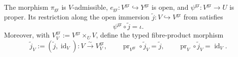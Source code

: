 \begin{lemma}
  \label{lemma:nagata-graph-extension}
  \lean{}

  The morphism $\pi_{\mathrm{gr}}$ is $V$-admissible,
  $e_{\mathrm{gr}}\colon V^{\mathrm{gr}}\hookrightarrow Y^{\mathrm{gr}}$ is
  open, and
  $\psi^{\mathrm{gr}}\colon V^{\mathrm{gr}}\to U$ is proper.  Its
  restriction along the open immersion
  $\widetilde j\colon V\hookrightarrow V^{\mathrm{gr}}$ from
   satisfies
  \[
    \psi^{\mathrm{gr}}\circ\widetilde j=\iota.
  \]
  Moreover, with
  $V^{\mathrm{gr}}_V:=V^{\mathrm{gr}}\times_UV$, define the typed
  fibre-product morphism
  \[
    \widetilde j_V:=(\widetilde j,\operatorname{id}_V)
      \colon V\xrightarrow{\sim}V^{\mathrm{gr}}_V,\qquad
    \operatorname{pr}_{V^{\mathrm{gr}}}\circ\widetilde j_V
        =\widetilde j,\qquad
    \operatorname{pr}_V\circ\widetilde j_V=\operatorname{id}_V.
  \]
\end{lemma}

